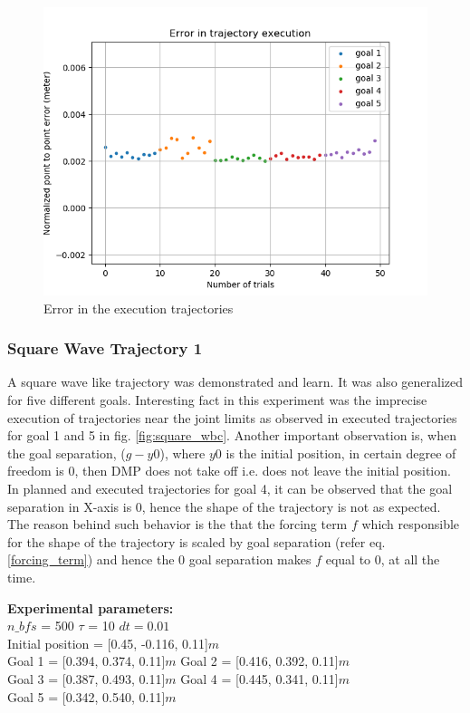\begin{figure}[H]
	\centering
	\includegraphics[scale=0.6]{images/2/inv_par_e.png}
	\caption{Error in the execution trajectories}
	\label{fig:inv_par_wbc_e}
\end{figure}


\subsubsection{Square Wave Trajectory 1}

A square wave like trajectory was demonstrated and learn. It was also generalized for five different goals. Interesting fact in this experiment was the imprecise execution of trajectories near the joint limits as observed in executed trajectories for goal 1 and 5 in fig. \ref{fig:square_wbc}. Another important observation is, when the goal separation, ($g - y0$), where $y0$ is the initial position, in certain degree of freedom is 0, then DMP does not take off i.e. does not leave the initial position. In planned and executed trajectories for goal 4, it can be observed that the goal separation in X-axis is 0, hence the shape of the trajectory is not as expected. The reason behind such behavior is the that the forcing term $f$ which responsible for the shape of the trajectory is scaled by goal separation (refer eq. \ref{forcing_term}) and hence the 0 goal separation makes $f$ equal to 0, at all the time.  

\textbf{Experimental parameters:} \\
$n\_bfs$ = 500 \hspace{3cm}
$\tau$ = 10 \hspace{3cm}
$dt = 0.01$\\
Initial position = [0.45, -0.116, 0.11]$m$ \\
Goal 1 = [0.394, 0.374, 0.11]$m$ \hspace{2cm}
Goal 2 = [0.416, 0.392, 0.11]$m$\\
Goal 3 = [0.387, 0.493, 0.11]$m$\hspace{2cm}
Goal 4 = [0.445, 0.341, 0.11]$m$\\
Goal 5 = [0.342, 0.540, 0.11]$m$

